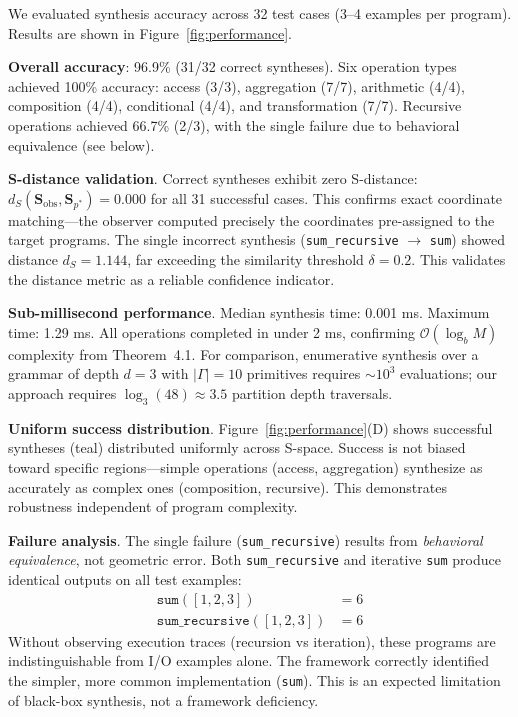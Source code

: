 \documentclass[twocolumn,10pt]{article}
\begin{document}
We evaluated synthesis accuracy across 32 test cases (3--4 examples per program). Results are shown in Figure~\ref{fig:performance}.

\textbf{Overall accuracy}: 96.9\% (31/32 correct syntheses). Six operation types achieved 100\% accuracy: access (3/3), aggregation (7/7), arithmetic (4/4), composition (4/4), conditional (4/4), and transformation (7/7). Recursive operations achieved 66.7\% (2/3), with the single failure due to behavioral equivalence (see below).

\textbf{S-distance validation}. Correct syntheses exhibit zero S-distance: $d_S(\mathbf{S}_{\text{obs}}, \mathbf{S}_{p^*}) = 0.000$ for all 31 successful cases. This confirms exact coordinate matching—the observer computed precisely the coordinates pre-assigned to the target programs. The single incorrect synthesis (\texttt{sum\_recursive} $\to$ \texttt{sum}) showed distance $d_S = 1.144$, far exceeding the similarity threshold $\delta = 0.2$. This validates the distance metric as a reliable confidence indicator.

\textbf{Sub-millisecond performance}. Median synthesis time: 0.001 ms. Maximum time: 1.29 ms. All operations completed in under 2 ms, confirming $\mathcal{O}(\log_b M)$ complexity from Theorem~4.1. For comparison, enumerative synthesis over a grammar of depth $d=3$ with $|\Gamma| = 10$ primitives requires $\sim 10^3$ evaluations; our approach requires $\log_3(48) \approx 3.5$ partition depth traversals.

\textbf{Uniform success distribution}. Figure~\ref{fig:performance}(D) shows successful syntheses (teal) distributed uniformly across S-space. Success is not biased toward specific regions—simple operations (access, aggregation) synthesize as accurately as complex ones (composition, recursive). This demonstrates robustness independent of program complexity.

\textbf{Failure analysis}. The single failure (\texttt{sum\_recursive}) results from \emph{behavioral equivalence}, not geometric error. Both \texttt{sum\_recursive} and iterative \texttt{sum} produce identical outputs on all test examples:
\begin{align}
\texttt{sum}([1,2,3]) &= 6 \\
\texttt{sum\_recursive}([1,2,3]) &= 6
\end{align}
Without observing execution traces (recursion vs iteration), these programs are indistinguishable from I/O examples alone. The framework correctly identified the simpler, more common implementation (\texttt{sum}). This is an expected limitation of black-box synthesis, not a framework deficiency.
\end{document}
